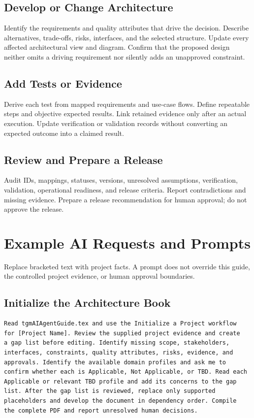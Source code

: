\subsection{Develop or Change Architecture}
Identify the requirements and quality attributes that drive the decision.
Describe alternatives, trade-offs, risks, interfaces, and the selected
structure. Update every affected architectural view and diagram. Confirm that
the proposed design neither omits a driving requirement nor silently adds an
unapproved constraint.

\subsection{Add Tests or Evidence}
Derive each test from mapped requirements and use-case flows. Define repeatable
steps and objective expected results. Link retained evidence only after an
actual execution. Update verification or validation records without converting
an expected outcome into a claimed result.

\subsection{Review and Prepare a Release}
Audit IDs, mappings, statuses, versions, unresolved assumptions, verification,
validation, operational readiness, and release criteria. Report contradictions
and missing evidence. Prepare a release recommendation for human approval; do
not approve the release.

\section{Example AI Requests and Prompts}
\label{Section:AIExamplePrompts}
Replace bracketed text with project facts. A prompt does not override this
guide, the controlled project evidence, or human approval boundaries.

\subsection{Initialize the Architecture Book}
\begin{verbatim}
Read tgmAIAgentGuide.tex and use the Initialize a Project workflow
for [Project Name]. Review the supplied project evidence and create
a gap list before editing. Identify missing scope, stakeholders,
interfaces, constraints, quality attributes, risks, evidence, and
approvals. Identify the available domain profiles and ask me to
confirm whether each is Applicable, Not Applicable, or TBD. Read each
Applicable or relevant TBD profile and add its concerns to the gap
list. After the gap list is reviewed, replace only supported
placeholders and develop the document in dependency order. Compile
the complete PDF and report unresolved human decisions.
\end{verbatim}

